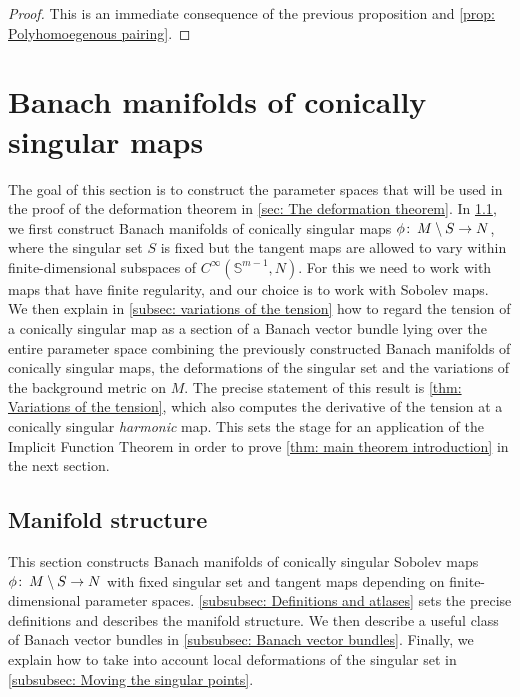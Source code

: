 \documentclass{article}
\numberwithin{equation}{section}        %
\theoremstyle{bfnote}
\theoremstyle{definition}
\theoremstyle{bfremark}
\newcommand{\col}{\colon \thinspace}        %
\newcommand{\Sp}{\mathbb{S}}                %
\begin{document}
\begin{proof}
    This is an immediate consequence of the previous proposition and \cref{prop: Polyhomoegenous pairing}.
\end{proof}


    \section{Banach manifolds of conically singular maps}       \label{sec: Banach manifolds}

The goal of this section is to construct the parameter spaces that will be used in the proof of the deformation theorem in \cref{sec: The deformation theorem}. In \cref{subsec: manifold structure}, we first construct Banach manifolds of conically singular maps $\phi \col M \setminus S \to N$, where the singular set $S$ is fixed but the tangent maps are allowed to vary within finite-dimensional subspaces of $C^\infty(\Sp^{m-1},N)$. For this we need to work with maps that have finite regularity, and our choice is to work with Sobolev maps. We then explain in \cref{subsec: variations of the tension} how to regard the tension of a conically singular map as a section of a Banach vector bundle lying over the entire parameter space combining the previously constructed Banach manifolds of conically singular maps, the deformations of the singular set and the variations of the background metric on $M$. The precise statement of this result is \cref{thm: Variations of the tension}, which also computes the derivative of the tension at a conically singular \emph{harmonic} map. This sets the stage for an application of the Implicit Function Theorem in order to prove \cref{thm: main theorem introduction} in the next section.


    \subsection{Manifold structure}     \label{subsec: manifold structure}

This section constructs Banach manifolds of conically singular Sobolev maps $\phi \col M \setminus S \to N$ with fixed singular set and tangent maps depending on finite-dimensional parameter spaces. \cref{subsubsec: Definitions and atlases} sets the precise definitions and describes the manifold structure. We then describe a useful class of Banach vector bundles in \cref{subsubsec: Banach vector bundles}. Finally, we explain how to take into account local deformations of the singular set in \cref{subsubsec: Moving the singular points}.
\end{document}
